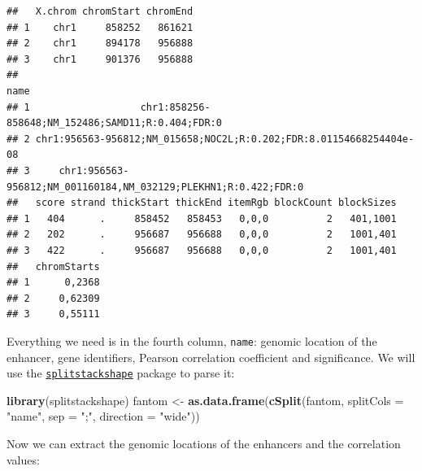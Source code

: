 \documentclass[9pt,a4paper,]{extarticle}
\newenvironment{Shaded}{\begin{snugshade}}{\end{snugshade}}
\newcommand{\KeywordTok}[1]{\textcolor[rgb]{0.13,0.29,0.53}{\textbf{#1}}}
\newcommand{\DataTypeTok}[1]{\textcolor[rgb]{0.13,0.29,0.53}{#1}}
\newcommand{\StringTok}[1]{\textcolor[rgb]{0.31,0.60,0.02}{#1}}
\newcommand{\NormalTok}[1]{#1}
\theoremstyle{definition}
\theoremstyle{definition}
\theoremstyle{definition}
\theoremstyle{remark}
\begin{document}
\begin{verbatim}
##   X.chrom chromStart chromEnd
## 1    chr1     858252   861621
## 2    chr1     894178   956888
## 3    chr1     901376   956888
##                                                                  name
## 1                   chr1:858256-858648;NM_152486;SAMD11;R:0.404;FDR:0
## 2 chr1:956563-956812;NM_015658;NOC2L;R:0.202;FDR:8.01154668254404e-08
## 3     chr1:956563-956812;NM_001160184,NM_032129;PLEKHN1;R:0.422;FDR:0
##   score strand thickStart thickEnd itemRgb blockCount blockSizes
## 1   404      .     858452   858453   0,0,0          2   401,1001
## 2   202      .     956687   956688   0,0,0          2   1001,401
## 3   422      .     956687   956688   0,0,0          2   1001,401
##   chromStarts
## 1      0,2368
## 2     0,62309
## 3     0,55111
\end{verbatim}

Everything we need is in the fourth column, \texttt{name}: genomic location of the enhancer, gene identifiers, Pearson correlation coefficient and significance.
We will use the \href{https://cran.r-project.org/package=splitstackshape}{\texttt{splitstackshape}} package to parse it:

\begin{Shaded}
\begin{Highlighting}[]
\KeywordTok{library}\NormalTok{(splitstackshape)}
\NormalTok{fantom <-}\StringTok{ }\KeywordTok{as.data.frame}\NormalTok{(}\KeywordTok{cSplit}\NormalTok{(fantom, }\DataTypeTok{splitCols =} \StringTok{"name"}\NormalTok{, }\DataTypeTok{sep =} \StringTok{";"}\NormalTok{, }\DataTypeTok{direction =} \StringTok{"wide"}\NormalTok{))}
\end{Highlighting}
\end{Shaded}

Now we can extract the genomic locations of the enhancers and the correlation values:
\end{document}
